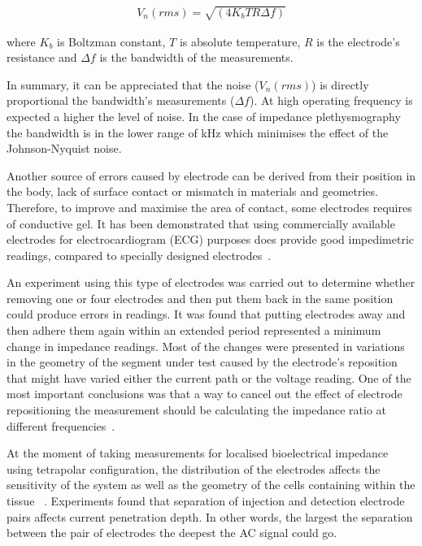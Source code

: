 \begin{align}
	\label{eq:nyquist noise}
	V_n(rms)=\sqrt{(4 K_b T R \Delta f)}
\end{align}

where $K_b$ is Boltzman constant, $T$ is absolute temperature, $R$ is the electrode’s resistance and $\Delta f$ is the bandwidth of the measurements. 

In summary, it can be appreciated that the noise ($V_n(rms)$) is directly proportional the bandwidth’s measurements ($\Delta f$). At high operating frequency is expected a higher the level of noise. In the case of impedance plethysmography the bandwidth is in the lower range of \si{\kilo\hertz} which minimises the effect of the Johnson-Nyquist noise.

Another source of errors caused by electrode can be derived from their position in the body, lack of surface contact or mismatch in materials and geometries. Therefore, to improve and maximise the area of contact, some electrodes requires of conductive gel. It has been demonstrated that using commercially available electrodes for electrocardiogram (ECG) purposes does provide good impedimetric readings, compared to specially designed electrodes~\cite{caicedo2012use}.

An experiment using this type of electrodes was carried out to determine whether removing one or four electrodes and then put them back in the same position could produce errors in readings. It was found that putting electrodes away and then adhere them again within an extended period represented a minimum change in impedance readings. Most of the changes were presented in variations in the geometry of the segment under test caused by the electrode's reposition that might have varied either the current path or the voltage reading. One of the most important conclusions was that a way to cancel out the effect of electrode repositioning the measurement should be calculating the impedance ratio at different frequencies~\cite{lozano1997electrode}.

At the moment of taking measurements for localised bioelectrical impedance using tetrapolar configuration, the distribution of the electrodes affects the sensitivity of the system as well as the geometry of the cells containing within the tissue ~\cite{bertemes2002tissue}. Experiments found that separation of injection and detection electrode pairs affects current penetration depth. In other words, the largest the separation between the pair of electrodes the deepest the AC signal could go.


